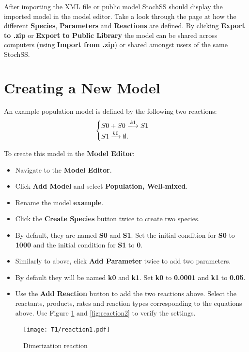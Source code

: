 After importing the XML file or public model StochSS should display the imported model in the model editor.
Take a look through the page at how the different \textbf{Species}, \textbf{Parameters} and \textbf{Reactions} are defined.
By clicking \textbf{Export to .zip} or \textbf{Export to Public Library} the model can be shared across computers (using \textbf{Import from .zip}) or shared amongst users of the same StochSS.

\section{Creating a New Model}
An example population model is defined by the following two reactions:
\[ \begin{cases}
S0 + S0 \xlongrightarrow{k1} S1 \nonumber \\
S1 \xrightarrow{k0} \emptyset . \nonumber 
\end{cases} \]

To create this model in the \textbf{Model Editor}:
\begin{itemize}
  \item Navigate to the \textbf{Model Editor}.
  \item Click \textbf{Add Model} and select \textbf{Population, Well-mixed}.
  \item Rename the model \textbf{example}.
  \item Click the \textbf{Create Species} button twice to create two species.
  \item By default, they are named \textbf{S0} and \textbf{S1}. Set the initial condition for \textbf{S0} to \textbf{1000} and the initial condition for \textbf{S1} to \textbf{0}.
  \item Similarly to above, click \textbf{Add Parameter} twice to add two parameters.
  \item By default they will be named \textbf{k0} and \textbf{k1}. Set \textbf{k0} to \textbf{0.0001} and \textbf{k1} to \textbf{0.05}.
  \item Use the \textbf{Add Reaction} button to add the two reactions above. Select the reactants, products, rates and reaction types corresponding to the equations above. Use Figure \ref{fig:reaction1} and \ref{fig:reaction2} to verify the settings.
\end{itemize}

\begin{figure}[!htb]
\centering
\texttt{[image: T1/reaction1.pdf]}
\caption{Dimerization reaction}
\label{fig:reaction1}
\end{figure}


